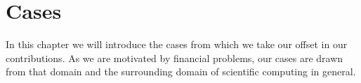 \chapter{Cases}

In this chapter we will introduce the cases from which we take our offset in
our contributions. As we are motivated by financial problems, our cases are
drawn from that domain and the surrounding domain of scientific computing in
general.


%
